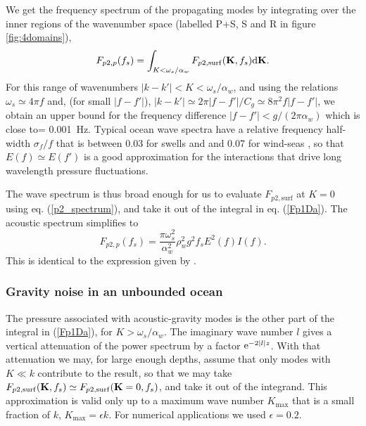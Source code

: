 We get the frequency spectrum of the propagating modes by integrating over 
the inner regions of the wavenumber space (labelled P+S, S and R in figure \ref{fig:4domains}), 
\begin{eqnarray}
F_{p2,p}(f_s)=\int_{K < \omega_s/\alpha_w}  F_{p2,\mathrm{surf}}(\mathbf{K} ,f_s) {\mathrm d}\mathbf{K}   \label{Fp1Da}.
\end{eqnarray}
For this range of wavenumbers $|k-k'|< K <  \omega_s/\alpha_w$, and using the relations 
 $\omega_s \simeq 4 \pi f$ and, (for small $|f-f'|$), $|k-k'| \simeq 2 \pi |f-f'|/C_g \simeq 8 \pi^2 f |f-f'|$, 
we obtain an upper bound for the frequency difference $ |f-f'| <  g /(2 \pi \alpha_w)$ which is close to= 0.001~Hz. 
Typical ocean wave spectra have a relative frequency half-width $\sigma_f/f$ that is between 0.03 for swells and and 0.07 
for wind-seas \citep{JONSWAP}, 
so that $ E(f) \simeq E(f')$ 
is a good approximation for the interactions that drive long wavelength pressure fluctuations.




The wave spectrum is
thus broad enough for us to evaluate $ F_{p2,\mathrm{surf}}$ at $K=0$ using eq. (\ref{p2_spectrum}), 
and take it out of the integral in eq. (\ref{Fp1Da}). The acoustic spectrum simplifies to
\begin{equation}
F_{p2,p}(f_s)=\frac{\pi \omega_s^2}{\alpha_w^2} \rho_w^2 g^2  f_s   E^2(f)I(f)   \label{eq:noise_Lloyd}.
\end{equation}
This is identical to the expression given by \cite{Lloyd1981}. 


\subsubsection{Gravity noise in an unbounded ocean}
The pressure associated with acoustic-gravity modes is the other part of the integral in  (\ref{Fp1Da}), 
for $K > \omega_s/\alpha_w$.  The imaginary wave number $l$ gives a   
vertical attenuation of the power spectrum by a factor $ \mathrm{e}^{-2|l|z}$. 
With that attenuation we may, for large enough depths, 
  assume that only modes with $K \ll k$ contribute to the result,  so that we may take 
$F_{p2,\mathrm{surf}}(\mathbf{K},f_s) \simeq F_{p2,\mathrm{surf}}(\mathbf{K}=0,f_s)$,  and take it out of the integrand. 
This approximation is valid only up to a maximum wave number $K_{\max}$ that is 
a small fraction of $k$, $K_{\max}=\epsilon k$. For numerical applications we used $\epsilon=0.2$. 

